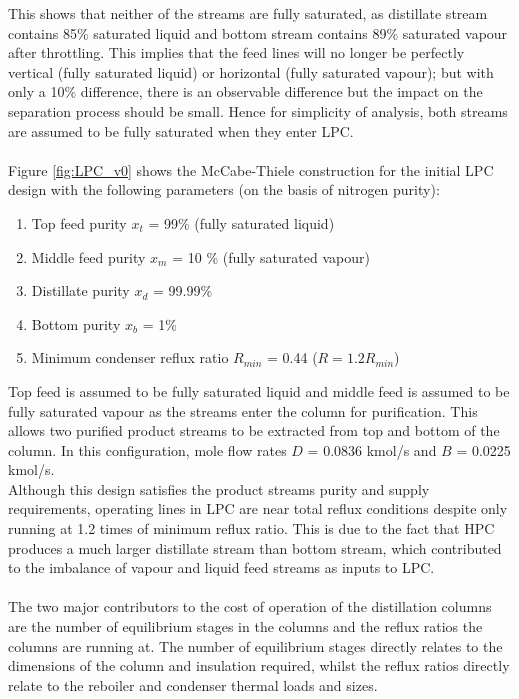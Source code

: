         \noindent This shows that neither of the streams are fully saturated, as distillate stream contains 85\% saturated liquid and bottom stream contains 89\% saturated vapour after throttling. This implies that the feed lines will no longer be perfectly vertical (fully saturated liquid) or horizontal (fully saturated vapour); but with only a 10\% difference, there is an observable difference but the impact on the separation process should be small. Hence for simplicity of analysis, both streams are assumed to be fully saturated when they enter LPC.\\
        \\
        Figure \ref{fig:LPC_v0} shows the McCabe-Thiele construction for the initial LPC design with the following parameters (on the basis of nitrogen purity):
        \begin{enumerate}
            \item Top feed purity $x_t$ = 99\% (fully saturated liquid)
            \item Middle feed purity $x_m$ = 10 \% (fully saturated vapour)
            \item Distillate purity $x_d$ = 99.99\%
            \item Bottom purity $x_b$ = 1\%
            \item Minimum condenser reflux ratio $R_{min}$ = 0.44 ($R = 1.2R_{min}$)
        \end{enumerate}
        Top feed is assumed to be fully saturated liquid and middle feed is assumed to be fully saturated vapour as the streams enter the column for purification. This allows two purified product streams to be extracted from top and bottom of the column. In this configuration, mole flow rates $D$ = 0.0836 kmol/s and $B$ = 0.0225 kmol/s. \\
        Although this design satisfies the product streams purity and supply requirements,  operating lines in LPC are near total reflux conditions despite only running at 1.2 times of minimum reflux ratio. This is due to the fact that HPC produces a much larger distillate stream than bottom stream, which contributed to the imbalance of vapour and liquid feed streams as inputs to LPC. \\
        \\
        The two major contributors to the cost of operation of the distillation columns are the number of equilibrium stages in the columns and the reflux ratios the columns are running at. The number of equilibrium stages directly relates to the dimensions of the column and insulation required, whilst the reflux ratios directly relate to the reboiler and condenser thermal loads and sizes. \\

